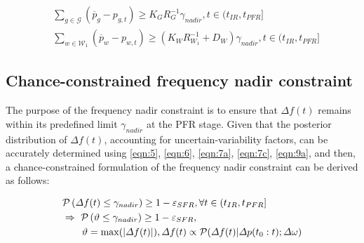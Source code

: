 \documentclass[lettersize,journal]{IEEEtran}
\newenvironment{newsubequations}{\small\begin{subequations}}{\end{subequations}}
\begin{document}
\vspace{-0.125in}
\begin{newsubequations}
	\label{eqn:12}
	\begin{align}
		 &\!\!\!\!\sum\nolimits_{g\in\mathcal{G}} \left( \overline{p}_{g} \!-\! p_{g, t}\right) \!\!\geq \!\! {K_{G} }{ R_{G}^{-1}} \gamma_{nadir}, t \in (t_{IR}, t_{PFR}] \label {eqn:12a} \\
		 &\!\!\!\!\sum\nolimits_{w\in\mathcal{W}_{1}} \!\!\!\!\!\left( \overline{p}_{w} \!-\! p_{w, t} \right) \!\!\geq\!\! (K_{W}R_{W_1}^{-1} \!\!+\!\! D_{W}) \gamma_{nadir}, t \in (t_{IR}, t_{PFR}] \label{eqn:12b}
	\end{align}
\end{newsubequations}

\vspace{-0.2in}
\subsection{Chance-constrained frequency nadir constraint}

The purpose of the frequency nadir constraint is to ensure that \(\varDelta f(t)\) remains within its predefined limit \(\gamma_{nadir}\) at the PFR stage. Given that the posterior distribution of \(\varDelta f(t)\), accounting for uncertain-variability factors, can be accurately determined using \eqref{eqn:5}, \eqref{eqn:6}, \eqref{eqn:7a}, \eqref{eqn:7c}, \eqref{eqn:9a}, and then, a chance-constrained formulation of the frequency nadir constraint can be derived as follows:

\vspace{-0.125in}
\begin{small}
	\begin{align}
	& \mathcal{P}\left(\varDelta f(t) \leq \gamma_{nadir}\right) \geq 1-\varepsilon_{SFR},\forall t\in(t_{IR}, t_{PFR}] \label{eqn:13} \\
	& \Rightarrow \,\,\mathcal{P}\left(\vartheta \leq \gamma_{nadir}\right) \geq 1-\varepsilon_{SFR},\notag\\
	& \qquad \vartheta = \max ( |\varDelta f(t)| ),\varDelta f(t) \propto \mathcal{P}(\varDelta f(t)|\varDelta p(t_0:t); \varDelta \omega) \notag
\end{align} \end{small}

\end{document}
